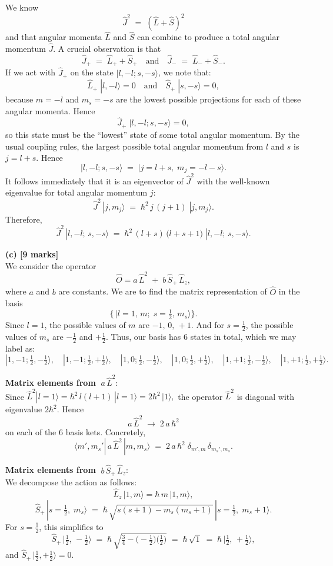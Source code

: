 \documentclass{article}
\begin{document}
We know 
\[
\hat{J}^2 \;=\; (\hat{L} + \hat{S})^2 
\]
and that angular momenta \(\hat{L}\) and \(\hat{S}\) can combine to produce a total angular momentum \(\hat{J}\). A crucial observation is that
\[
\hat{J}_+ \;=\; \hat{L}_+ + \hat{S}_+ 
\quad\text{and}\quad
\hat{J}_- \;=\; \hat{L}_- + \hat{S}_-.
\]
If we act with \(\hat{J}_+\) on the state \(|l,-l; s,-s\rangle\), we note that:
\[
\hat{L}_+\;|l,-l\rangle = 0 
\quad\text{and}\quad
\hat{S}_+\;|s,-s\rangle = 0,
\]
because \(m=-l\) and \(m_s=-s\) are the lowest possible projections for each of these angular momenta. Hence
\[
\hat{J}_+\;|l,-l; s,-s\rangle = 0,
\]
so this state must be the ``lowest'' state of some total angular momentum. By the usual coupling rules, the largest possible total angular momentum from \(l\) and \(s\) is \(j = l + s\). Hence
\[
|l,-l; s,-s\rangle 
\;=\; |j=l+s,\; m_j=-l-s\rangle.
\]
It follows immediately that it is an eigenvector of \(\hat{J}^2\) with the well-known eigenvalue for total angular momentum \(j\):
\[
\hat{J}^2\,|j,m_j\rangle 
\;=\; \hbar^2\,j\,(j+1)\;|j,m_j\rangle.
\]
Therefore,
\[
\hat{J}^2\,|l,-l;\,s,-s\rangle
\;=\;\hbar^2\,(l+s)\,\bigl(l+s+1\bigr)\;|l,-l;\,s,-s\rangle.
\]

\bigskip

\textbf{(c) [9 marks]}\\
We consider the operator
\[
\hat{O} = a\,\hat{L}^2 \;+\; b\,\hat{S}_+\,\hat{L}_z,
\]
where \(a\) and \(b\) are constants. We are to find the matrix representation of \(\hat{O}\) in the basis
\[
\bigl\{\,|l=1,\,m;\;s=\tfrac12,\,m_s\rangle\bigr\}.
\]
Since \(l=1\), the possible values of \(m\) are \(-1,\,0,\,+1\). And for \(s=\tfrac12\), the possible values of \(m_s\) are \(-\tfrac12\) and \(+\tfrac12\). Thus, our basis has 6 states in total, which we may label as:
\[
|1,-1;\tfrac12,-\tfrac12\rangle,\quad
|1,-1;\tfrac12,+\tfrac12\rangle,\quad
|1,0;\tfrac12,-\tfrac12\rangle,\quad
|1,0;\tfrac12,+\tfrac12\rangle,\quad
|1,+1;\tfrac12,-\tfrac12\rangle,\quad
|1,+1;\tfrac12,+\tfrac12\rangle.
\]

\textbf{Matrix elements from} \(\;a\,\hat{L}^2\):\\
Since \(\hat{L}^2 |l=1\rangle = \hbar^2\,l(l+1)\,|l=1\rangle = 2\hbar^2\,|1\rangle,\) the operator \(\hat{L}^2\) is diagonal with eigenvalue \(2\hbar^2\). Hence
\[
a\,\hat{L}^2 \;\rightarrow\; 2\,a\,\hbar^2 
\]
on each of the 6 basis kets. Concretely,
\[
\langle m',m_s'|\,a\,\hat{L}^2\,|m,m_s\rangle 
\;=\; 2\,a\,\hbar^2\;\delta_{m',m}\,\delta_{m_s',m_s}.
\]

\textbf{Matrix elements from} \(\;b\,\hat{S}_+\,\hat{L}_z\):\\
We decompose the action as follows:
\[
\hat{L}_z\,|1,m\rangle = \hbar\,m\,|1,m\rangle,
\]
\[
\hat{S}_+\,|s=\tfrac12,\;m_s\rangle 
\;=\; \hbar\,\sqrt{s(s+1) - m_s(m_s+1)}\,|s=\tfrac12,\;m_s+1\rangle.
\]
For \(s=\tfrac12\), this simplifies to
\[
\hat{S}_+\,\bigl|\tfrac12,\,-\tfrac12\bigr\rangle 
\;=\; \hbar\,\sqrt{\tfrac34 - \bigl(-\tfrac12\bigr)\bigl(\tfrac12\bigr)} 
\;=\;\hbar\,\sqrt{1} 
\;=\; \hbar\,\bigl|\tfrac12,\,+\tfrac12\bigr\rangle,
\]
and 
\(\hat{S}_+\,|\tfrac12,+\tfrac12\rangle=0.\)
\end{document}
